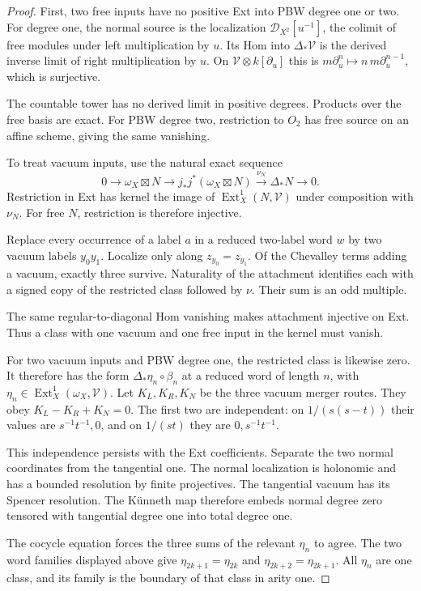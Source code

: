 \begin{proof}
First, two free
inputs have no
positive Ext into
PBW degree one
or two. For
degree one, the
normal source is
the localization
$\mathcal D_{X^2}[u^{-1}]$,
the colimit of
free modules under
left multiplication
by $u$.
Its Hom into
$\Delta_*\mathscr V$
is the derived
inverse limit of
right multiplication
by $u$. On
$\mathscr V\otimes k[\partial_u]$
this is
$m\partial_u^n\mapsto n\,m\partial_u^{n-1}$,
which is surjective.

The countable tower
has no derived
limit in positive
degrees. Products
over the free
basis are exact.
For PBW degree
two, restriction
to $O_2$ has
free source on
an affine scheme,
giving the same
vanishing.

To treat vacuum
inputs, use the
natural exact
sequence
\[
 0\to\omega_X\boxtimes N\to
 j_*j^*(\omega_X\boxtimes N)
 \xrightarrow{\nu_N}\Delta_*N\to0.
\]
Restriction in
Ext has kernel
the image of
$\operatorname{Ext}^1_X(N,\mathscr V)$
under composition
with $\nu_N$.
For free $N$,
restriction is
therefore injective.

Replace every occurrence
of a label $a$
in a reduced
two-label word
$w$ by two
vacuum labels
$y_0y_1$.
Localize only along
$z_{y_0}=z_{y_1}$.
Of the Chevalley
terms adding a
vacuum, exactly
three survive.
Naturality of the
attachment identifies
each with a
signed copy of
the restricted
class followed
by $\nu$.
Their sum is
an odd multiple.

The same regular-to-diagonal
Hom vanishing
makes attachment
injective on
Ext.
Thus a class
with one vacuum
and one free
input in the
kernel must
vanish.

For two vacuum
inputs and PBW
degree one,
the restricted
class is likewise
zero. It therefore
has the form
$\Delta_*\eta_n\circ\beta_n$
at a reduced
word of length
$n$, with
$\eta_n\in
\operatorname{Ext}^1_X(\omega_X,\mathscr V)$.
Let $K_L,K_R,K_N$
be the three
vacuum merger
routes. They obey
$K_L-K_R+K_N=0$.
The first two
are independent:
on $1/(s(s-t))$
their values
are $s^{-1}t^{-1},0$,
and on $1/(st)$
they are
$0,s^{-1}t^{-1}$.

This independence
persists with
the Ext coefficients.
Separate the two
normal coordinates
from the tangential
one. The normal
localization is
holonomic and has
a bounded resolution
by finite projectives.
The tangential
vacuum has its
Spencer resolution.
The K\"unneth map
therefore embeds
normal degree zero
tensored with
tangential degree
one into total
degree one.

The cocycle
equation forces
the three sums
of the relevant
$\eta_n$ to agree.
The two word
families displayed
above give
$\eta_{2k+1}=\eta_{2k}$
and
$\eta_{2k+2}=\eta_{2k+1}$.
All $\eta_n$
are one class,
and its family
is the boundary
of that class
in arity one.


\end{proof}

